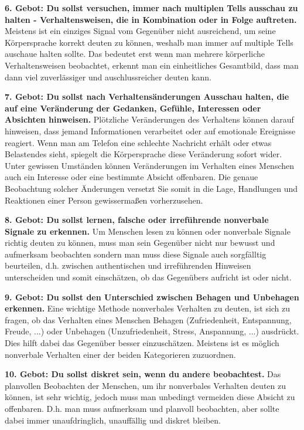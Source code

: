 \par\textbf{6. Gebot: Du sollst versuchen, immer nach multiplen Tells ausschau zu halten - Verhaltensweisen, die in Kombination oder in Folge auftreten.}
Meistens ist ein einziges Signal vom Gegenüber nicht ausreichend, um seine Körpersprache korrekt deuten zu können, 
weshalb man immer auf multiple Tells auschaue halten sollte. Das bedeutet erst wenn man mehrere körperliche Verhaltensweisen beobachtet, erkennt man 
ein einheitliches Gesamtbild, dass man dann viel zuverlässiger und auschlussreicher deuten kann.

\par\textbf{7. Gebot: Du sollst nach Verhaltensänderungen Ausschau halten, die auf eine Veränderung der Gedanken, Gefühle, Interessen oder Absichten hinweisen.}
Plötzliche Veränderungen des Verhaltens können darauf hinweisen, dass jemand Informationen verarbeitet oder auf emotionale Ereignisse reagiert.
Wenn man am Telefon eine schlechte Nachricht erhält oder etwas Belastendes sieht, spiegelt die Körpersprache diese Veränderung sofort wider. 
Unter gewissen Umständen können Veränderungen im Verhalten eines Menschen auch ein Interesse oder eine bestimmte Absicht offenbaren. 
Die genaue Beobachtung solcher Änderungen versetzt Sie somit in die Lage, Handlungen und Reaktionen einer Person gewissermaßen vorherzusehen. \cite{menschen_lesen}
 

\par\textbf{8. Gebot: Du sollst lernen, falsche oder irreführende nonverbale Signale zu erkennen.}
Um Menschen lesen zu können oder nonverbale Signale richtig deuten zu können, muss man sein Gegenüber
nicht nur bewusst und aufmerksam beobachten sondern man muss diese Signale auch sorgfälltig beurteilen, 
d.h. zwischen authentischen und irreführenden Hinweisen unterscheiden und somit einschätzen, ob das Gegenübers aufricht ist oder nicht.

\par\textbf{9. Gebot: Du sollst den Unterschied zwischen Behagen und Unbehagen erkennen.}
Eine wichtige Methode nonverbales Verhalten zu deuten, ist sich zu fragen, ob das Verhalten eines Menschen Behagen (Zufriedenheit, Entspannung, Freude, ...) 
oder Unbehagen (Unzufriedenheit, Stress, Anspannung, ...) ausdrückt. Dies hilft dabei das Gegenüber besser einzuschätzen. Meistens ist es 
möglich nonverbale Verhalten einer der beiden Kategorieren zuzuordnen.


\par\textbf{10. Gebot: Du sollst diskret sein, wenn du andere beobachtest.}
Das planvollen Beobachten der Menschen, um ihr nonverbales Verhalten deuten zu können, ist sehr wichtig, jedoch muss man unbedingt
vermeiden diese Absicht zu offenbaren. D.h. man muss aufmerksam und planvoll beobachten, aber sollte dabei immer unaufdringlich, unauffällig und diskret bleiben.
